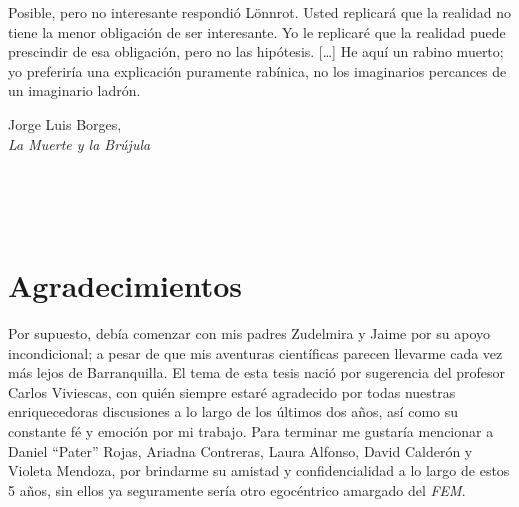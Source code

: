 \epigraph{
  Posible, pero no interesante respondi\'{o} L{\"o}nnrot. Usted replicar\'{a} que la realidad no tiene la menor obligaci\'{o}n de ser interesante. Yo le replicar\'{e} que la realidad puede prescindir de esa obligaci\'{o}n, pero no las hip\'{o}tesis. [\ldots] He aqu\'{i} un rabino muerto; yo preferir\'{i}a una explicaci\'{o}n puramente rab\'{i}nica, no los imaginarios percances de un imaginario ladr\'{o}n.}{Jorge Luis Borges,\\ \textit{La Muerte y la Br\'{u}jula }}


\newpage{\pagestyle{empty}\cleardoublepage}

\thispagestyle{empty} \textbf{}\normalsize
\\\\\\%
\chapter*{Agradecimientos}
Por supuesto, deb\'{i}a comenzar con mis padres Zudelmira y Jaime por su apoyo
incondicional; a pesar de que mis aventuras cient\'{i}ficas parecen llevarme cada vez m\'{a}s lejos de
Barranquilla. El tema de esta tesis naci\'{o} por sugerencia del profesor Carlos Viviescas, con qui\'{e}n
siempre estar\'{e} agradecido por todas nuestras enriquecedoras discusiones a lo largo de los \'{u}ltimos dos
a\~{n}os, as\'{i} como su constante f\'{e} y emoci\'{o}n por mi trabajo. Para terminar me gustar\'{i}a
mencionar a
Daniel ``Pater'' Rojas, Ariadna Contreras, Laura Alfonso, David Calder\'{o}n y Violeta Mendoza, por brindarme su
amistad y confidencialidad a lo largo de estos 5 a\~{n}os, sin ellos ya seguramente ser\'{i}a otro
egoc\'{e}ntrico amargado del \textit{FEM}.
\\

\newpage{\pagestyle{empty}\cleardoublepage}


